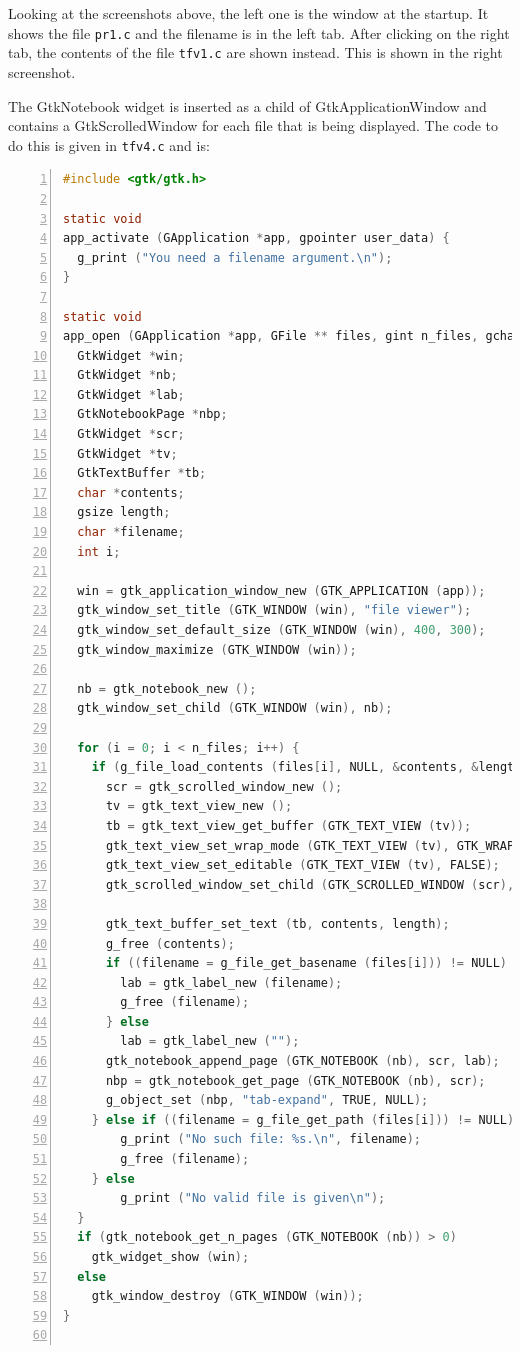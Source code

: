 Looking at the screenshots above, the left one is the window at the
startup. It shows the file \passthrough{\lstinline!pr1.c!} and the
filename is in the left tab. After clicking on the right tab, the
contents of the file \passthrough{\lstinline!tfv1.c!} are shown instead.
This is shown in the right screenshot.

The GtkNotebook widget is inserted as a child of GtkApplicationWindow
and contains a GtkScrolledWindow for each file that is being displayed.
The code to do this is given in \passthrough{\lstinline!tfv4.c!} and is:

\begin{lstlisting}[language=C, numbers=left]
#include <gtk/gtk.h>

static void
app_activate (GApplication *app, gpointer user_data) {
  g_print ("You need a filename argument.\n");
}

static void
app_open (GApplication *app, GFile ** files, gint n_files, gchar *hint, gpointer user_data) {
  GtkWidget *win;
  GtkWidget *nb;
  GtkWidget *lab;
  GtkNotebookPage *nbp;
  GtkWidget *scr;
  GtkWidget *tv;
  GtkTextBuffer *tb;
  char *contents;
  gsize length;
  char *filename;
  int i;

  win = gtk_application_window_new (GTK_APPLICATION (app));
  gtk_window_set_title (GTK_WINDOW (win), "file viewer");
  gtk_window_set_default_size (GTK_WINDOW (win), 400, 300);
  gtk_window_maximize (GTK_WINDOW (win));

  nb = gtk_notebook_new ();
  gtk_window_set_child (GTK_WINDOW (win), nb);

  for (i = 0; i < n_files; i++) {
    if (g_file_load_contents (files[i], NULL, &contents, &length, NULL, NULL)) {
      scr = gtk_scrolled_window_new ();
      tv = gtk_text_view_new ();
      tb = gtk_text_view_get_buffer (GTK_TEXT_VIEW (tv));
      gtk_text_view_set_wrap_mode (GTK_TEXT_VIEW (tv), GTK_WRAP_WORD_CHAR);
      gtk_text_view_set_editable (GTK_TEXT_VIEW (tv), FALSE);
      gtk_scrolled_window_set_child (GTK_SCROLLED_WINDOW (scr), tv);

      gtk_text_buffer_set_text (tb, contents, length);
      g_free (contents);
      if ((filename = g_file_get_basename (files[i])) != NULL) {
        lab = gtk_label_new (filename);
        g_free (filename);
      } else
        lab = gtk_label_new ("");
      gtk_notebook_append_page (GTK_NOTEBOOK (nb), scr, lab);
      nbp = gtk_notebook_get_page (GTK_NOTEBOOK (nb), scr);
      g_object_set (nbp, "tab-expand", TRUE, NULL);
    } else if ((filename = g_file_get_path (files[i])) != NULL) {
        g_print ("No such file: %s.\n", filename);
        g_free (filename);
    } else
        g_print ("No valid file is given\n");
  }
  if (gtk_notebook_get_n_pages (GTK_NOTEBOOK (nb)) > 0)
    gtk_widget_show (win);
  else
    gtk_window_destroy (GTK_WINDOW (win));
}


\end{lstlisting}

